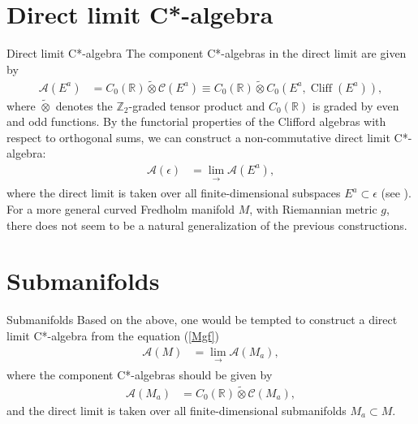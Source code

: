 \documentclass{beamer}
\begin{document}
\section{Direct limit C*-algebra}
\begin{frame}{Direct limit C*-algebra}
    The component C*-algebras in the direct limit are given by
        \begin{align*}
            \mathcal{A}(E^{a}) &= C_{0}(\mathbb{R}) \widetilde{\otimes} \mathcal{C}(E^{a}) \equiv C_{0}(\mathbb{R}) \widetilde{\otimes} C_{0}(E^{a}, \operatorname{Cliff}(E^{a})),
        \end{align*}
        where \(\widetilde{\otimes}\) denotes the \(\mathbb{Z}_{2}\)-graded tensor product and \(C_{0}(\mathbb{R})\) is graded by even and odd functions. By the functorial properties of the Clifford algebras with respect to orthogonal sums, we can construct a non-commutative direct limit C*-algebra:
        \begin{align*}
            \mathcal{A}(\epsilon) &= \lim_{\substack{\to}} \mathcal{A}(E^{a}),
        \end{align*}
        where the direct limit is taken over all finite-dimensional subspaces \(E^{a} \subset \epsilon\) (see {\color{blue}\cite{olsen2010}}). For a more general curved Fredholm manifold \(M\), with Riemannian metric \(g\), there does not seem to be a natural generalization of the previous constructions.
\end{frame}
\section{Submanifolds}
\begin{frame}{Submanifolds}
    Based on the above, one would be tempted to construct a direct limit C*-algebra from the equation ({\color{blue}\ref{Mgf}})
        \begin{align}
            \mathcal{A}(M) &= \lim_{\substack{\to}} \mathcal{A}(M_{a}),
        \end{align}
        where the component C*-algebras should be given by
        \begin{align}
            \mathcal{A}(M_{a}) &= C_{0}(\mathbb{R}) \widetilde{\otimes} \mathcal{C}(M_{a}),
        \end{align}
        and the direct limit is taken over all finite-dimensional submanifolds \(M_{a} \subset M\).
\end{frame}
\end{document}
